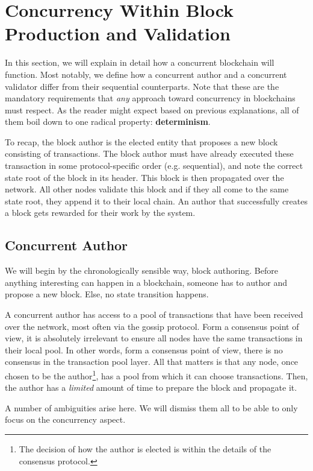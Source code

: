 \section{Concurrency Within Block Production and Validation} \label{chap_approach:sec:concurrency}

In this section, we will explain in detail how a concurrent blockchain will function. Most notably,
we define how a concurrent author and a concurrent validator differ from their sequential
counterparts. Note that these are the mandatory requirements that \textit{any} approach toward
concurrency in blockchains must respect. As the reader might expect based on previous explanations,
all of them boil down to one radical property: \textbf{determinism}.

To recap, the block author is the elected entity that proposes a new block consisting of
transactions. The block author must have already executed these transaction in some
protocol-specific order (e.g. sequential), and note the correct state root of the block in its
header. This block is then propagated over the network. All other nodes validate this block and if
they all come to the same state root, they append it to their local chain. An author that
successfully creates a block gets rewarded for their work by the system.

\subsection{Concurrent Author}

We will begin by the chronologically sensible way, block authoring. Before anything interesting can
happen in a blockchain, someone has to author and propose a new block. Else, no state transition
happens.

A concurrent author has access to a pool of transactions that have been received over the network,
most often via the gossip protocol. Form a consensus point of view, it is absolutely irrelevant to
ensure all nodes have the same transactions in their local pool. In other words, form a consensus
point of view, there is no consensus in the transaction pool layer. All that matters is that any
node, once chosen to be the author\footnote{The decision of how the author is elected is within the
details of the consensus protocol.}, has a pool from which it can choose transactions. Then, the
author has a \textit{limited} amount of time to prepare the block and propagate it.

A number of ambiguities arise here. We will dismiss them all to be able to only focus on the
concurrency aspect.

